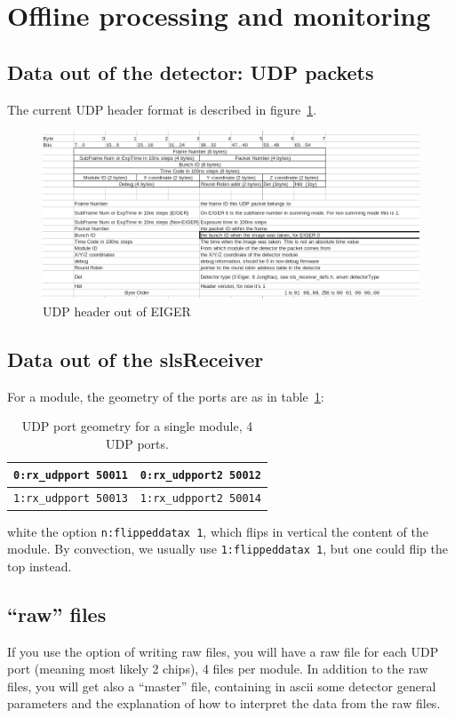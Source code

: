 \documentclass{article}
\begin{document}
\section{Offline processing and monitoring}

\subsection{Data out of the detector: UDP packets}\label{UDP}

The current UDP header format is described in figure~\ref{UDPheader}.
\begin{figure}[t]
\begin{center}
\includegraphics[width=1.2\textwidth]{EIGERUDPHeader}
\end{center}
\caption{UDP header out of EIGER}
\label{UDPheader}
\end{figure}
 
\subsection{Data out of the slsReceiver}


For a module, the geometry of the ports are as in table~\ref{tports}: 
\begin{table}
\begin{tabular}{|c|c|}
\hline
{\tt{0:rx\_udpport 50011}} &  {\tt{0:rx\_udpport2 50012}}\\  
\hline
{\tt{1:rx\_udpport 50013}} &  {\tt{1:rx\_udpport2 50014}}\\  
\hline
\end{tabular}
\caption{UDP port geometry for a single module, 4 UDP ports.}
\label{tports}
\end{table}
white the option {\tt{n:flippeddatax 1}}, which flips in vertical the content of the module. By convection, we usually use {\tt{1:flippeddatax 1}}, but one could flip the top instead.


\subsection{``raw'' files}
If you use the option of writing raw files, you will have a raw file for each UDP port (meaning most likely 2 chips), 4 files per module. In addition to the raw files, you will get also a ``master'' file, containing in ascii some detector general parameters and the explanation of how to interpret the data from the raw files.
   
\end{document}
